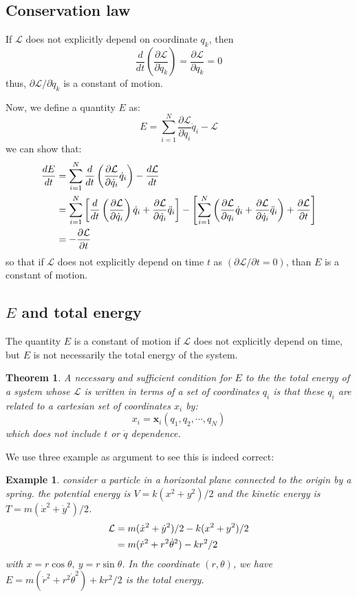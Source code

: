 \documentclass{article}
\newcommand{\pfrac}[2]{\frac{\partial #1}{\partial #2}}
\newcommand{\ddt}[1]{\frac{d}{dt}\left( #1 \right)}
\renewcommand{\L}{\mathcal{L}}
\newcommand{\dotx}{\dot{x}}
\newcommand{\dotq}{\dot{q}}
\newtheorem{theorem}{Theorem}
\newtheorem{example}{Example}
\begin{document}
\subsection{Conservation law}
If $\L$ does not explicitly depend on coordinate $q_k$, then
\begin{equation}
    \ddt{\pfrac{ \L}{\dotq_k}} = \pfrac{\L}{q_k} = 0
\end{equation}
thus, $\partial \L / \partial \dotq_k $ is a constant of motion.

Now, we define a quantity $E$ as:
\begin{equation}
    E = \sum_{i=1}^N \pfrac{\L}{\dotq_i} \dotq_i - \L
\end{equation}
we can show that:
\begin{align}
    \frac{dE}{dt} &= \sum_{i=1}^N \ddt{\pfrac{\L}{\dotq_i} \dotq_i} - \frac{d\L}{dt} \notag \\
    &= \sum_{i=1}^N \left[ \ddt{\pfrac{\L}{\dotq_i}}\dotq_i + \pfrac{\L}{\dotq_i}\ddot{q}_i \right]
    - \left[ \sum_{i=1}^N\left( \pfrac{\L}{q_i}\dotq_i + \pfrac{\L}{\dotq_i}\ddot{q}_i \right) + \pfrac{\L}{t}\right] \notag \\
    &= - \pfrac{\L}{t}
\end{align}
so that if $\L$ does not explicitly depend on time $t$ as $(\partial \L / \partial t = 0)$, than $E$ is a constant of motion.

\subsection{$E$ and total energy}
The quantity $E$ is a constant of motion if $\L$ does not explicitly depend on time, but $E$ is not 
necessarily the total energy of the system.

\begin{theorem}
A necessary and sufficient condition for $E$ to the the 
total energy of a system whose $\L$ is written in terms of a set of coordinates
$q_i$ is that these $q_i$ are related to a cartesian set of coordinates $x_i$ by:
\begin{equation}
    x_i = \mathbf{x}_i (q_1, q_2, \cdots, q_N)
\end{equation}
which does not include $t$ or $\dotq$ dependence.
\end{theorem}

We use three example as argument to see this is indeed correct:

\begin{example}
consider a particle in a horizontal plane connected to the origin by a spring. the potential 
energy is $V = k(x^2+y^2) / 2$ and the kinetic energy is $T = m(\dotx^2 + \dot{y}^2)/2$. 
\begin{align}
    \L &= m(\dotx^2 + \dot{y}^2)/2 - k(x^2+y^2) / 2 \notag \\
     &= m(\dot{r}^2 + r^2\dot{\theta}^2) - kr^2/2 \notag
\end{align}
with $x = r\cos\theta,\ y = r\sin\theta$. 
In the coordinate $(r,\theta)$, we have $E = m(\dot{r}^2 + r^2\dot{\theta}^2) + kr^2/2$ is the total energy.
\end{example}
\end{document}
